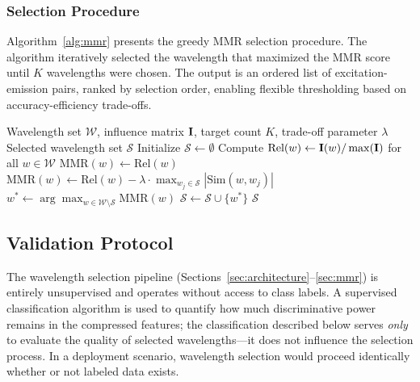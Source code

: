 \subsubsection{Selection Procedure}
Algorithm~\ref{alg:mmr} presents the greedy MMR selection procedure.
The algorithm iteratively selected the wavelength that maximized the MMR score until $K$ wavelengths were chosen.
The output is an ordered list of excitation-emission pairs, ranked by selection order, enabling flexible thresholding based on accuracy-efficiency trade-offs.

\begin{algorithm}[t]
\caption{MMR Wavelength Selection}
\label{alg:mmr}
\begin{algorithmic}[1]
\REQUIRE Wavelength set $\mathcal{W}$, influence matrix $\mathbf{I}$, target count $K$, trade-off parameter $\lambda$
\ENSURE Selected wavelength set $\mathcal{S}$
\STATE Initialize $\mathcal{S} \gets \emptyset$
\STATE Compute $\text{Rel}(w) \gets \mathbf{I}(w) / \max(\mathbf{I})$ for all $w \in \mathcal{W}$
            \STATE $\text{MMR}(w) \gets \text{Rel}(w)$
        \ELSE
            \STATE $\text{MMR}(w) \gets \text{Rel}(w) - \lambda \cdot \max_{w_j \in \mathcal{S}} |\text{Sim}(w, w_j)|$
        \ENDIF
    \ENDFOR
    \STATE $w^* \gets \arg\max_{w \in \mathcal{W} \setminus \mathcal{S}} \text{MMR}(w)$
    \STATE $\mathcal{S} \gets \mathcal{S} \cup \{w^*\}$
\ENDFOR
\RETURN $\mathcal{S}$
\end{algorithmic}
\end{algorithm}

\subsection{Validation Protocol}
\label{sec:validation}

The wavelength selection pipeline (Sections~\ref{sec:architecture}--\ref{sec:mmr}) is entirely unsupervised and operates without access to class labels.
A supervised classification algorithm is used to quantify how much discriminative power remains in the compressed features; the classification described below serves \emph{only} to evaluate the quality of selected wavelengths---it does not influence the selection process.
In a deployment scenario, wavelength selection would proceed identically whether or not labeled data exists.

